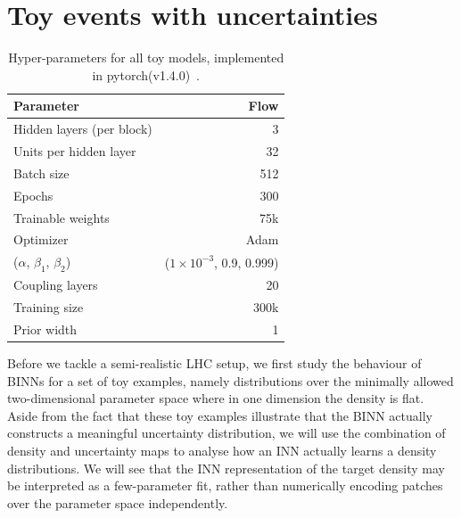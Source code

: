\section{Toy events with uncertainties}
\label{sec:toy}

\begin{table}[b!]
\begin{small} \begin{center}
\begin{tabular}{l r }
\toprule
Parameter & Flow\\
\midrule
Hidden layers (per block) & 3 \\
Units per hidden layer & 32 \\
Batch size & 512\\
Epochs & 300 \\
Trainable weights &  75k  \\
Optimizer & Adam \\
($\alpha$, $\beta_1$, $\beta_2$)  & ($1\times10^{-3}$, 0.9, 0.999) \\
Coupling layers & 20 \\
Training size & 300k \\
Prior width & 1 \\
\bottomrule
\end{tabular}
\end{center} \end{small}
\caption{Hyper-parameters for all toy models, implemented in pytorch(v1.4.0)~\cite{pytorch}.}
\label{tab:toy_params}
\end{table}

Before we tackle a semi-realistic LHC setup, we first study the
behaviour of BINNs for a set of toy examples, namely distributions over
the minimally allowed two-dimensional parameter space where in one
dimension the density is flat. Aside from the fact that these toy
examples illustrate that the BINN actually constructs a meaningful
uncertainty distribution, we will use the combination of density and
uncertainty maps to analyse how an INN actually learns a density
distributions. We will see that the INN representation of the target density 
may be interpreted as a few-parameter fit, rather than numerically 
encoding patches over the parameter space independently.

